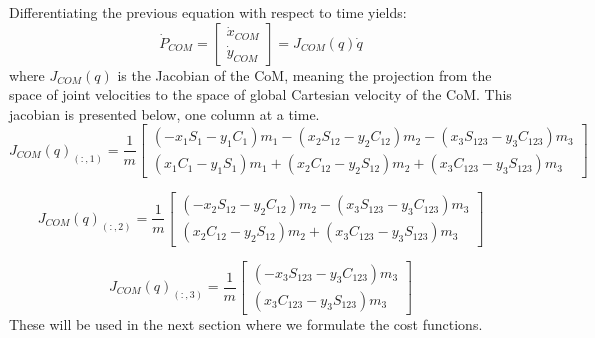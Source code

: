 \documentclass[12pt, a4paper]{article}
\begin{document}
\noindent Differentiating the previous equation with respect to time yields:
\begin{equation}
    \dot{P}_{COM} = 
    \begin{bmatrix}
    \dot{x}_{COM}\\
    \dot{y}_{COM}
    \end{bmatrix}
    =
    J_{COM}(q) \dot{q}
\end{equation}
\noindent where $J_{COM}(q)$ is the Jacobian of the CoM, meaning the projection from the space of joint velocities to the space of global Cartesian velocity of the CoM. This jacobian is presented below, one column at a time.
\begin{equation}
    J_{COM}(q)_{(:, 1)} = \frac{1}{m}
    \begin{bmatrix}
    (-x_1 S_1 - y_1 C_1)m_1 - (x_2 S_{12} - y_2 C_{12})m_2 - (x_3 S_{123} - y_3 C_{123})m_3\\
    (x_1 C_1 - y_1 S_1)m_1 + (x_2 C_{12} - y_2 S_{12})m_2 + (x_3 C_{123} - y_3 S_{123})m_3
    \end{bmatrix}
\end{equation}

\begin{equation}
    J_{COM}(q)_{(:, 2)} = \frac{1}{m}
    \begin{bmatrix}
    (- x_2 S_{12} - y_2 C_{12})m_2 - (x_3 S_{123} - y_3 C_{123})m_3\\
    (x_2 C_{12} - y_2 S_{12})m_2 + (x_3 C_{123} - y_3 S_{123})m_3
    \end{bmatrix}
\end{equation}

\begin{equation}
    J_{COM}(q)_{(:, 3)} = \frac{1}{m}
    \begin{bmatrix}
    (- x_3 S_{123} - y_3 C_{123})m_3\\
    (x_3 C_{123} - y_3 S_{123})m_3
    \end{bmatrix}
\end{equation}
These will be used in the next section where we formulate the cost functions.
\end{document}
